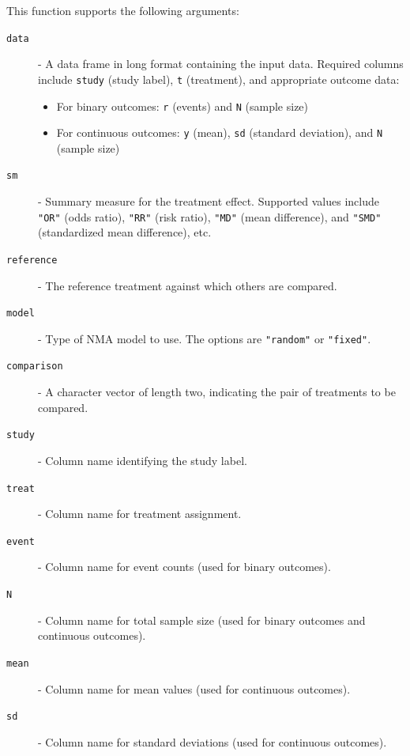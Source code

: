 This function supports the following arguments:

\begin{description}

 \item[\texttt{data}] - A data frame in long format containing the input data. Required columns include \texttt{study} (study label), \texttt{t} (treatment), and appropriate outcome data:
    \begin{itemize}
      \item For binary outcomes: \texttt{r} (events) and \texttt{N} (sample size)
      \item For continuous outcomes: \texttt{y} (mean), \texttt{sd} (standard deviation), and \texttt{N} (sample size)
    \end{itemize}

  \item[\texttt{sm}] - Summary measure for the treatment effect. Supported values include \texttt{"OR"} (odds ratio), \texttt{"RR"} (risk ratio), \texttt{"MD"} (mean difference), and \texttt{"SMD"} (standardized mean difference), etc.

  \item[\texttt{reference}] - The reference treatment against which others are compared.

  \item[\texttt{model}] - Type of NMA model to use. The options are \texttt{"random"} or \texttt{"fixed"}.

  \item[\texttt{comparison}] - A character vector of length two, indicating the pair of treatments to be compared.

  \item[\texttt{study}] - Column name identifying the study label.

  \item[\texttt{treat}] - Column name for treatment assignment.

  \item[\texttt{event}] - Column name for event counts (used for binary outcomes).

  \item[\texttt{N}] - Column name for total sample size (used for binary outcomes and continuous outcomes).

  \item[\texttt{mean}] - Column name for mean values (used for continuous outcomes).

  \item[\texttt{sd}] - Column name for standard deviations (used for continuous outcomes).


\end{description}
